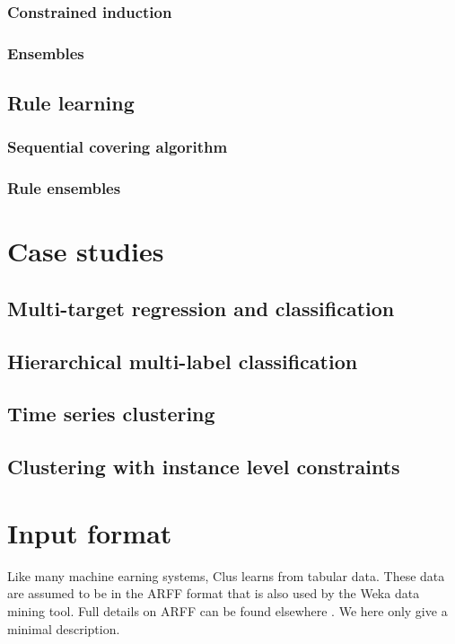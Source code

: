 \documentclass[a4paper]{report}
\begin{document}
\subsection{Constrained induction}

\subsection{Ensembles}

\section{Rule learning}

\subsection{Sequential covering algorithm}

\subsection{Rule ensembles}

\chapter{Case studies}

\section{Multi-target regression and classification}

\section{Hierarchical multi-label classification}

\section{Time series clustering}

\section{Clustering with instance level constraints}

\chapter{Input format}

Like many machine earning systems, Clus learns from tabular data.
These data are assumed to be in the ARFF format that is also used by the Weka data mining tool.  Full details on ARFF can be found elsewhere \cite{arff?}.
We here only give a minimal description.
\end{document}
